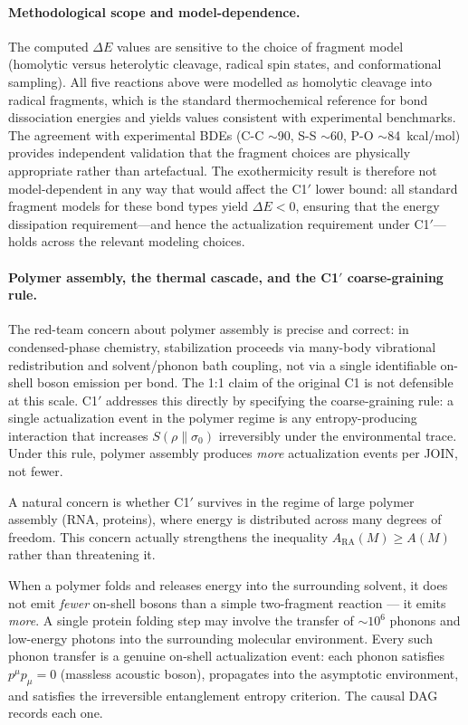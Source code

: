 \documentclass[11pt,a4paper]{article}
\theoremstyle{plain}
\theoremstyle{definition}
\theoremstyle{remark}
\newcommand{\ARA}{A_{\mathrm{RA}}}
\begin{document}
\paragraph{Methodological scope and model-dependence.}
The computed $\Delta E$ values are sensitive to the choice of fragment model
(homolytic versus heterolytic cleavage, radical spin states, and conformational
sampling). All five reactions above were modelled as homolytic cleavage into
radical fragments, which is the standard thermochemical reference for bond
dissociation energies and yields values consistent with experimental benchmarks.
The agreement with experimental BDEs (C-C $\sim$90, S-S $\sim$60, P-O
$\sim$84~kcal/mol) provides independent validation that the fragment choices
are physically appropriate rather than artefactual. The exothermicity result is
therefore not model-dependent in any way that would affect the C1$'$ lower bound:
all standard fragment models for these bond types yield $\Delta E < 0$, ensuring
that the energy dissipation requirement---and hence the actualization requirement
under C1$'$---holds across the relevant modeling choices.

\paragraph{Polymer assembly, the thermal cascade, and the C1$'$ coarse-graining rule.}
The red-team concern about polymer assembly is precise and correct: in
condensed-phase chemistry, stabilization proceeds via many-body vibrational
redistribution and solvent/phonon bath coupling, not via a single identifiable
on-shell boson emission per bond. The 1:1 claim of the original C1 is not
defensible at this scale. C1$'$ addresses this directly by specifying the
coarse-graining rule: a single actualization event in the polymer regime is any
entropy-producing interaction that increases $S(\rho \| \sigma_0)$ irreversibly
under the environmental trace. Under this rule, polymer assembly produces
\emph{more} actualization events per JOIN, not fewer.

A natural concern is whether C1$'$ survives in the regime of large polymer assembly
(RNA, proteins), where energy is distributed across many degrees of freedom. This
concern actually strengthens the inequality $\ARA(M) \geq A(M)$ rather than
threatening it.

When a polymer folds and releases energy into the surrounding solvent, it does not
emit \emph{fewer} on-shell bosons than a simple two-fragment reaction --- it emits
\emph{more}. A single protein folding step may involve the transfer of $\sim
10^6$ phonons and low-energy photons into the surrounding molecular environment.
Every such phonon transfer is a genuine on-shell actualization event: each phonon
satisfies $p^\mu p_\mu = 0$ (massless acoustic boson), propagates into the
asymptotic environment, and satisfies the irreversible entanglement entropy
criterion. The causal DAG records each one.
\end{document}
